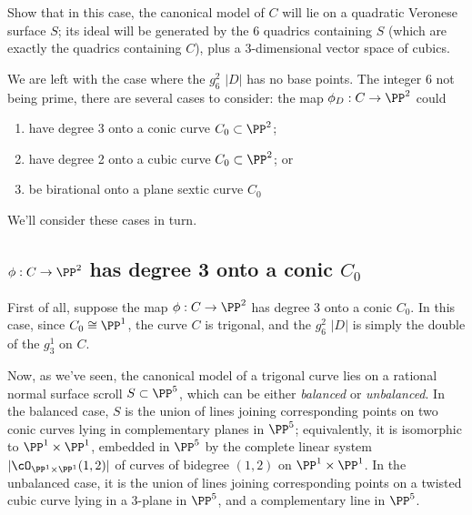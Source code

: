 \begin{exercise}
Show that in this case, the canonical model of $C$ will lie on a quadratic Veronese surface $S$; its  ideal will be generated by the 6 quadrics containing $S$ (which are exactly the quadrics containing $C$), plus a 3-dimensional vector space of cubics.
\end{exercise} 


We are left with the case where the $g^2_6$ $|D|$ has no base points. The integer 6 not being prime, there are several cases to consider: the map $\phi_D : C \to \PP^2$ could
\begin{enumerate}
\item have degree 3 onto a conic curve $C_0 \subset \PP^2$;
\item have degree 2 onto a cubic curve $C_0 \subset \PP^2$; or
\item be birational onto a plane sextic curve $C_0$
\end{enumerate}
We'll consider these cases in turn.

\subsection{$\phi : C \to \PP^2$ has degree 3 onto a conic $C_0$}

First of all, suppose the map $\phi : C \to \PP^2$ has degree 3 onto a conic $C_0$. In this case, since $C_0 \cong \PP^1$, the curve $C$ is trigonal, and the $g^2_6$ $|D|$ is simply the double of the $g^1_3$ on $C$. 

Now, as we've seen, the canonical model of a trigonal curve lies on a rational normal surface scroll $S \subset \PP^5$, which can be either \emph{balanced} or \emph{unbalanced}. In the balanced case, $S$ is the union of lines joining corresponding points on two conic curves lying in complementary planes in $\PP^5$; equivalently, it is isomorphic to $\PP^1 \times \PP^1$, embedded in $\PP^5$ by the complete linear system $|\cO_{\PP^1 \times \PP^1}(1,2)|$ of curves of bidegree $(1,2)$ on $\PP^1 \times \PP^1$. In the unbalanced case, it is the union of lines joining corresponding points on a twisted cubic curve lying in a 3-plane in $\PP^5$, and a complementary line in $\PP^5$.


